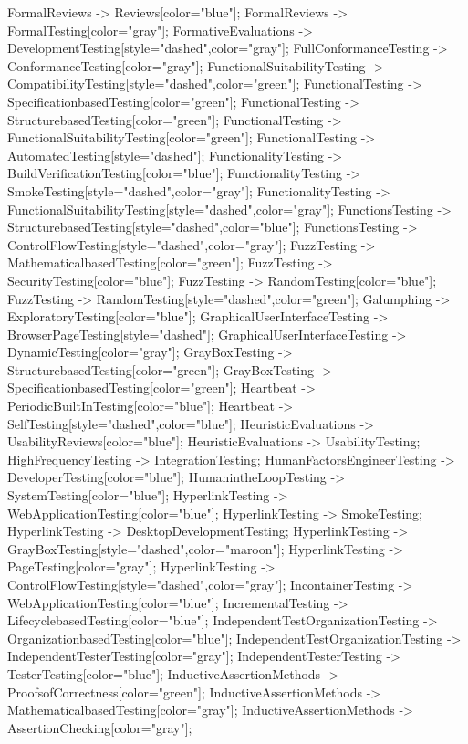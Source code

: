 \documentclass{article}
\begin{document}
{FormalReviews -> Reviews[color="blue"];
FormalReviews -> FormalTesting[color="gray"];
FormativeEvaluations -> DevelopmentTesting[style="dashed",color="gray"];
FullConformanceTesting -> ConformanceTesting[color="gray"];
FunctionalSuitabilityTesting -> CompatibilityTesting[style="dashed",color="green"];
FunctionalTesting -> SpecificationbasedTesting[color="green"];
FunctionalTesting -> StructurebasedTesting[color="green"];
FunctionalTesting -> FunctionalSuitabilityTesting[color="green"];
FunctionalTesting -> AutomatedTesting[style="dashed"];
FunctionalityTesting -> BuildVerificationTesting[color="blue"];
FunctionalityTesting -> SmokeTesting[style="dashed",color="gray"];
FunctionalityTesting -> FunctionalSuitabilityTesting[style="dashed",color="gray"];
FunctionsTesting -> StructurebasedTesting[style="dashed",color="blue"];
FunctionsTesting -> ControlFlowTesting[style="dashed",color="gray"];
FuzzTesting -> MathematicalbasedTesting[color="green"];
FuzzTesting -> SecurityTesting[color="blue"];
FuzzTesting -> RandomTesting[color="blue"];
FuzzTesting -> RandomTesting[style="dashed",color="green"];
Galumphing -> ExploratoryTesting[color="blue"];
GraphicalUserInterfaceTesting -> BrowserPageTesting[style="dashed"];
GraphicalUserInterfaceTesting -> DynamicTesting[color="gray"];
GrayBoxTesting -> StructurebasedTesting[color="green"];
GrayBoxTesting -> SpecificationbasedTesting[color="green"];
Heartbeat -> PeriodicBuiltInTesting[color="blue"];
Heartbeat -> SelfTesting[style="dashed",color="blue"];
HeuristicEvaluations -> UsabilityReviews[color="blue"];
HeuristicEvaluations -> UsabilityTesting;
HighFrequencyTesting -> IntegrationTesting;
HumanFactorsEngineerTesting -> DeveloperTesting[color="blue"];
HumanintheLoopTesting -> SystemTesting[color="blue"];
HyperlinkTesting -> WebApplicationTesting[color="blue"];
HyperlinkTesting -> SmokeTesting;
HyperlinkTesting -> DesktopDevelopmentTesting;
HyperlinkTesting -> GrayBoxTesting[style="dashed",color="maroon"];
HyperlinkTesting -> PageTesting[color="gray"];
HyperlinkTesting -> ControlFlowTesting[style="dashed",color="gray"];
IncontainerTesting -> WebApplicationTesting[color="blue"];
IncrementalTesting -> LifecyclebasedTesting[color="blue"];
IndependentTestOrganizationTesting -> OrganizationbasedTesting[color="blue"];
IndependentTestOrganizationTesting -> IndependentTesterTesting[color="gray"];
IndependentTesterTesting -> TesterTesting[color="blue"];
InductiveAssertionMethods -> ProofsofCorrectness[color="green"];
InductiveAssertionMethods -> MathematicalbasedTesting[color="gray"];
InductiveAssertionMethods -> AssertionChecking[color="gray"];
}
\end{document}
